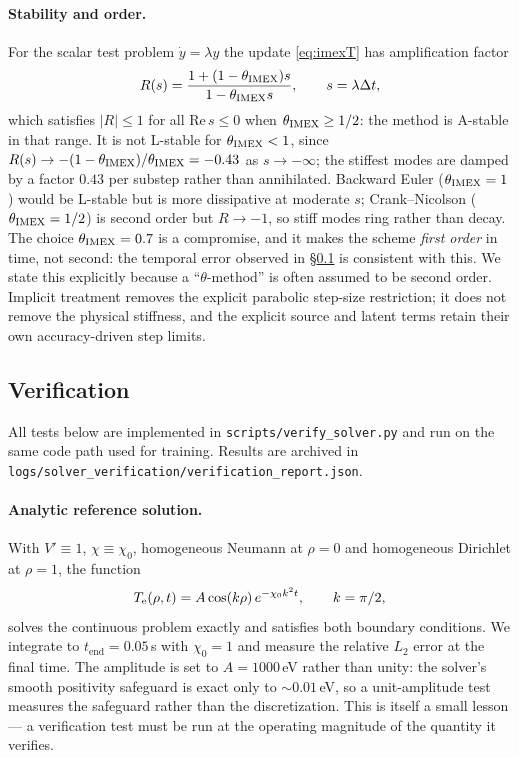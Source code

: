 \paragraph{Stability and order.} For the scalar test problem
$\dot y = \lambda y$ the update \eqref{eq:imexT} has amplification factor
\begin{equation}
R(s) = \frac{1 + (1-\theta_{\mathrm{IMEX}})s}{1 - \theta_{\mathrm{IMEX}} s}, \qquad s = \lambda \Delta t,
\label{eq:amp}
\end{equation}
which satisfies $|R| \le 1$ for all $\mathrm{Re}\,s \le 0$ when
$\theta_{\mathrm{IMEX}} \ge 1/2$: the method is A-stable in that range. It is not
L-stable for $\theta_{\mathrm{IMEX}} < 1$, since
$R(s) \to -(1-\theta_{\mathrm{IMEX}})/\theta_{\mathrm{IMEX}} = -0.43$ as $s \to -\infty$; the stiffest
modes are damped by a factor $0.43$ per substep rather than annihilated.
Backward Euler ($\theta_{\mathrm{IMEX}} = 1$) would be L-stable but is more dissipative
at moderate $s$; Crank--Nicolson ($\theta_{\mathrm{IMEX}} = 1/2$) is second order but
$R \to -1$, so stiff modes ring rather than decay. The choice
$\theta_{\mathrm{IMEX}} = 0.7$ is a compromise, and it makes the scheme
\emph{first order} in time, not second: the temporal error observed in
\S\ref{app:num-verif} is consistent with this. We state this explicitly
because a ``$\theta$-method'' is often assumed to be second order.
Implicit treatment removes the explicit parabolic step-size restriction;
it does not remove the physical stiffness, and the explicit source and
latent terms retain their own accuracy-driven step limits.

\subsection{Verification}
\label{app:num-verif}

All tests below are implemented in \texttt{scripts/verify\_solver.py} and
run on the same code path used for training. Results are archived in
\texttt{logs/solver\_verification/verification\_report.json}.

\paragraph{Analytic reference solution.} With $V' \equiv 1$,
$\chi \equiv \chi_0$, homogeneous Neumann at $\rho=0$ and homogeneous
Dirichlet at $\rho=1$, the function
\begin{equation}
T_{\mathrm{e}}(\rho,t) = A\cos(k\rho)\,e^{-\chi_0 k^2 t}, \qquad k = \pi/2,
\label{eq:analytic}
\end{equation}
solves the continuous problem exactly and satisfies both boundary
conditions. We integrate to $t_{\mathrm{end}} = 0.05\,$s with
$\chi_0 = 1$ and measure the relative $L_2$ error at the final time.
The amplitude is set to $A = 1000\,$eV rather than unity: the solver's
smooth positivity safeguard is exact only to $\sim0.01\,$eV, so a
unit-amplitude test measures the safeguard rather than the discretization.
This is itself a small lesson --- a verification test must be run at the
operating magnitude of the quantity it verifies.

